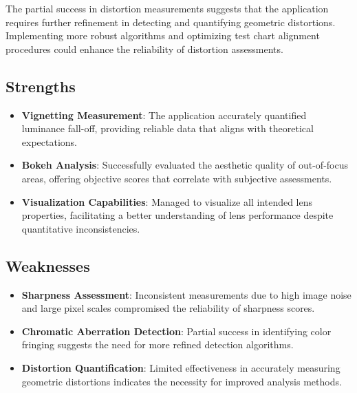 \documentclass{book}
\begin{document}
The partial success in distortion measurements suggests that the application requires further refinement in detecting and quantifying geometric distortions. Implementing more robust algorithms and optimizing test chart alignment procedures could enhance the reliability of distortion assessments.

\subsection{Strengths}
\begin{itemize}
    \item \textbf{Vignetting Measurement}: The application accurately quantified luminance fall-off, providing reliable data that aligns with theoretical expectations.
    \item \textbf{Bokeh Analysis}: Successfully evaluated the aesthetic quality of out-of-focus areas, offering objective scores that correlate with subjective assessments.
    \item \textbf{Visualization Capabilities}: Managed to visualize all intended lens properties, facilitating a better understanding of lens performance despite quantitative inconsistencies.
\end{itemize}

\subsection{Weaknesses}
\begin{itemize}
    \item \textbf{Sharpness Assessment}: Inconsistent measurements due to high image noise and large pixel scales compromised the reliability of sharpness scores.
    \item \textbf{Chromatic Aberration Detection}: Partial success in identifying color fringing suggests the need for more refined detection algorithms.
    \item \textbf{Distortion Quantification}: Limited effectiveness in accurately measuring geometric distortions indicates the necessity for improved analysis methods.
\end{itemize}
\end{document}
